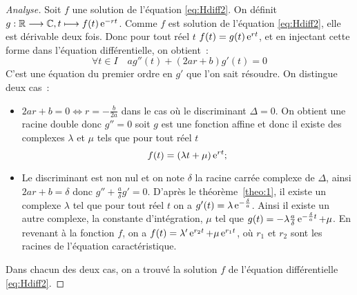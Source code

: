 \begin{proof}[Analyse] Soit \(f\) une solution de l'équation \eqref{eq:Hdiff2}. On définit \(g:\mathbb{R} \longrightarrow \mathbb{C}, t \longmapsto f(t)\operatorname{e}^{-rt}\). Comme \(f\) est solution de l'équation \eqref{eq:Hdiff2}, elle est dérivable deux fois. Donc pour tout réel \(t\) \(f(t)=g(t) \operatorname{e}^{rt}\), et en injectant cette forme dans l'équation différentielle, on obtient~:
\begin{equation}
  \forall t \in I \quad ag''(t)+(2ar+b)g'(t)=0
\end{equation}
C'est une équation du premier ordre en \(g'\) que l'on sait résoudre. On distingue deux cas~:
\begin{itemize}
\item \(2ar+b=0 \iff r=-\frac{b}{2a}\) dans le cas où le discriminant \(\Delta = 0\). On obtient une racine double donc \(g''=0\) soit \(g\) est une fonction affine et donc il existe des complexes \(\lambda\) et \(\mu\) tels que pour tout réel \(t\)
  \begin{equation}
   f(t)=(\lambda t+\mu)\operatorname{e}^{rt};
  \end{equation}
\item Le discriminant est non nul et on note \(\delta\) la racine carrée complexe de \(\Delta\), ainsi \(2ar+b=\delta\) donc \(g''+\frac{a}{\delta} g'=0\). D'après le théorème~\ref{theo:1}, il existe un complexe \(\lambda\) tel que pour tout réel \(t\) on a \(g'(t)=\lambda \operatorname{e}^{-\frac{\delta}{a}}\). Ainsi il existe un autre complexe, la constante d'intégration, \(\mu\) tel que \(g(t)=-\lambda \frac{a}{\delta} \operatorname{e}^{-\frac{\delta}{a} t} + \mu\). En revenant à la fonction \(f\), on a \(f(t)=\lambda' \operatorname{e}^{r_2 t} + \mu \operatorname{e}^{r_1 t}\), où \(r_1\) et \(r_2\) sont les racines de l'équation caractéristique.
\end{itemize}
Dans chacun des deux cas, on a trouvé la solution \(f\) de l'équation différentielle \eqref{eq:Hdiff2}.
\end{proof}
